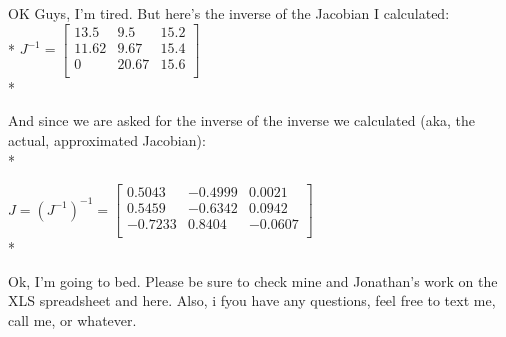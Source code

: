 \documentclass{article}
\begin{document}
OK Guys, I'm tired. But here's the inverse of the Jacobian I calculated: \\*
$J^{-1} =
\left[\begin{array}{ccc}
13.5 & 9.5 & 15.2\\
11.62 & 9.67 & 15.4\\
0 & 20.67 & 15.6\\
\end{array}\right]$ \\*

And since we are asked for the inverse of the inverse we calculated (aka, the actual, approximated Jacobian): \\*

$J = (J^{-1})^{-1} =
\left[\begin{array}{ccc}
0.5043 & -0.4999 & 0.0021\\
0.5459 & -0.6342 & 0.0942\\
-0.7233 & 0.8404 & -0.0607\\
\end{array}\right]$ \\*

Ok, I'm going to bed. Please be sure to check mine and Jonathan's work on the XLS spreadsheet and here. Also, i fyou have any questions, feel free to text me, call me, or whatever.
\end{document}
